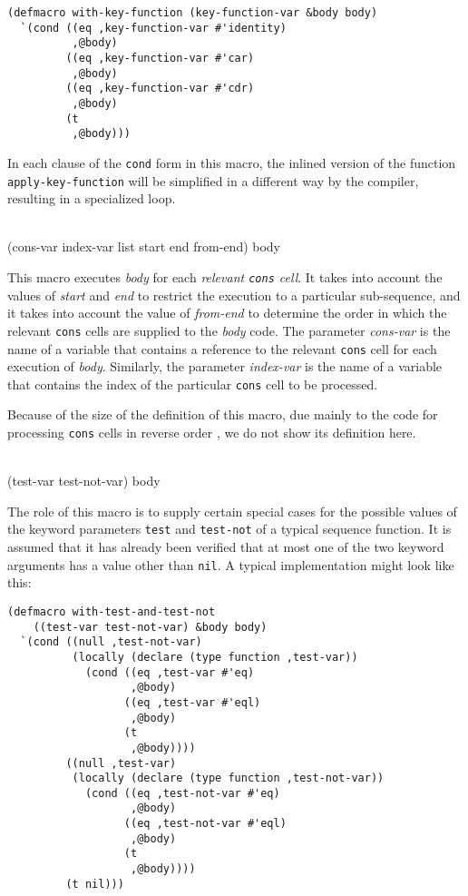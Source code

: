 {\small\begin{verbatim}
(defmacro with-key-function (key-function-var &body body)
  `(cond ((eq ,key-function-var #'identity)
          ,@body)
         ((eq ,key-function-var #'car)
          ,@body)
         ((eq ,key-function-var #'cdr)
          ,@body)
         (t
          ,@body)))
\end{verbatim}}

In each clause of the \texttt{cond} form in this macro, the inlined
version of the function \texttt{apply-key-function} will be simplified
in a different way by the compiler, resulting in a specialized loop.

\\
{(cons-var index-var list start end from-end) \body body}

This macro executes \textit{body} for each \emph{relevant
  \texttt{cons} cell}.  It takes into account the values of
\textit{start} and \textit{end} to restrict the execution to a
particular sub-sequence, and it takes into account the value of
\textit{from-end} to determine the order in which the relevant
\texttt{cons} cells are supplied to the \textit{body} code.  The
parameter \textit{cons-var} is the name of a variable that contains a
reference to the relevant \texttt{cons} cell for each execution of
\textit{body}.  Similarly, the parameter \textit{index-var} is the
name of a variable that contains the index of the particular
\texttt{cons} cell to be processed.

Because of the size of the definition of this macro, due mainly to the
code for processing \texttt{cons} cells in reverse order
\cite{Durand:2015:ELS:reverse}, we do not show its definition here.

\\
{(test-var test-not-var) \body body}

The role of this macro is to supply certain special cases for the
possible values of the keyword parameters \texttt{test} and
\texttt{test-not} of a typical sequence function.  It is assumed that
it has already been verified that at most one of the two keyword
arguments has a value other than \texttt{nil}.  A typical
implementation might look like this:

{\small\begin{verbatim}
(defmacro with-test-and-test-not
    ((test-var test-not-var) &body body)
  `(cond ((null ,test-not-var)
          (locally (declare (type function ,test-var))
            (cond ((eq ,test-var #'eq)
                   ,@body)
                  ((eq ,test-var #'eql)
                   ,@body)
                  (t
                   ,@body))))
         ((null ,test-var)
          (locally (declare (type function ,test-not-var))
            (cond ((eq ,test-not-var #'eq)
                   ,@body)
                  ((eq ,test-not-var #'eql)
                   ,@body)
                  (t
                   ,@body))))
         (t nil)))
\end{verbatim}}

